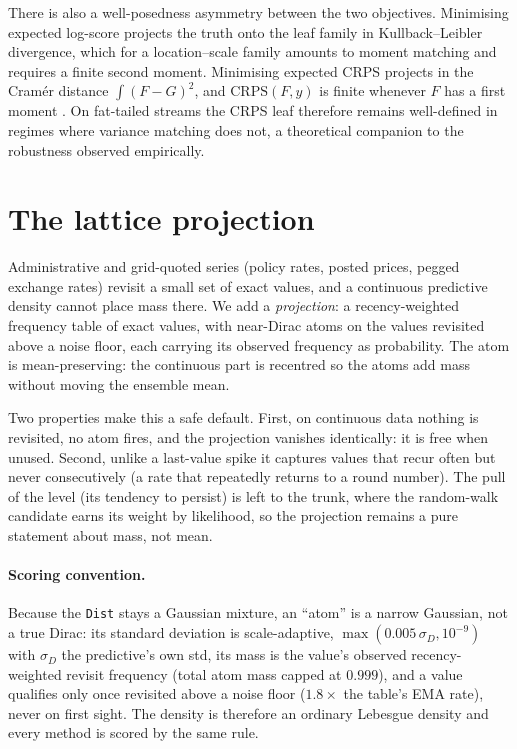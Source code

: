 \documentclass[article]{jss}
\providecommand{\code}[1]{\texttt{#1}}
\begin{document}
There is also a well-posedness asymmetry between the two objectives.
Minimising expected log-score projects the truth onto the leaf family in
Kullback--Leibler divergence, which for a location--scale family amounts to
moment matching and requires a finite second moment. Minimising expected CRPS
projects in the Cram\'er distance $\int (F-G)^2$, and $\mathrm{CRPS}(F,y)$ is
finite whenever $F$ has a first moment \citep{gneiting2007strictly}. On
fat-tailed streams the CRPS leaf therefore remains well-defined in regimes
where variance matching does not, a theoretical companion to the robustness
observed empirically.

\section{The lattice projection} \label{sec:lattice}

Administrative and grid-quoted series (policy rates, posted prices, pegged
exchange rates) revisit a small set of exact values, and a continuous
predictive density cannot place mass there. We add a \emph{projection}: a
recency-weighted frequency table of exact values, with near-Dirac atoms on the
values revisited above a noise floor, each carrying its observed frequency as
probability. The atom is mean-preserving: the continuous part is
recentred so the atoms add mass without moving the ensemble mean.

Two properties make this a safe default. First, on continuous data nothing is
revisited, no atom fires, and the projection vanishes identically: it is free
when unused. Second, unlike a last-value spike it captures values that recur
often but never consecutively (a rate that repeatedly returns to a round number).
The pull of the level (its tendency to persist) is left to the trunk, where the
random-walk candidate earns its weight by likelihood, so the projection remains a
pure statement about mass, not mean.

\paragraph{Scoring convention.}
Because the \code{Dist} stays a Gaussian mixture, an ``atom'' is a narrow
Gaussian, not a true Dirac: its standard deviation is scale-adaptive,
$\max(0.005\,\sigma_D, 10^{-9})$ with $\sigma_D$ the predictive's own std, its
mass is the value's observed recency-weighted revisit frequency (total atom mass
capped at $0.999$), and a value qualifies only once revisited above a noise
floor ($1.8\times$ the table's EMA rate), never on first sight. The density is
therefore an ordinary Lebesgue density and every method is scored by the same
rule.
\end{document}
